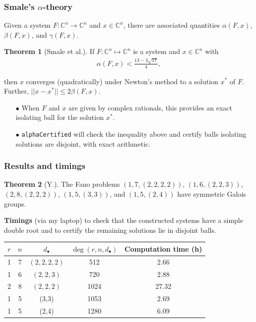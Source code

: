 \documentclass{beamer}
\theoremstyle{definition}
\newtheorem{thm}{Theorem}
\begin{document}
\begin{frame}
\frametitle{Smale's $\alpha$-theory}
Given a system $F:\mathbb{C}^n\to\mathbb{C}^n$ and $x\in\mathbb{C}^n$, there are associated quantities $\alpha(F,x)$, $\beta(F,x)$, and $\gamma(F,x)$. 

\begin{thm}[Smale et al.]
If $F:\mathbb{C}^n\mapsto\mathbb{C}^n$ is a system and $x\in\mathbb{C}^n$ with 
\vspace{-.2cm}
\begin{align*}
\alpha(F,x) < \frac{13-3\sqrt{17}}{4},
\end{align*}
\vspace{-.85cm}

then $x$ converges (quadratically) under Newton's method to a solution $x^\ast$ of $F$. Further, $||x-x^\ast||\le 2\beta(F,x)$.
\end{thm}

\begin{enumerate}
\item[$\bullet$] When $F$ and $x$ are given by complex rationals, this provides an exact isolating ball for the solution $x^\ast$. 

\item[$\bullet$] \texttt{alphaCertified} will check the inequality above and certify balls isolating solutions are disjoint, with exact arithmetic. 
\end{enumerate}

\end{frame}

\begin{frame}
\frametitle{Results and timings}
\begin{thm}[Y.] 
The Fano problems $(1,7,(2,2,2,2))$, $(1,6,(2,2,3))$, $(2,8,(2,2,2))$, $(1,5,(3,3))$, and $(1,5,(2,4))$ have symmetric Galois groups.
\end{thm}

\textbf{Timings} (via my laptop) to check that the constructed systems have a simple double root and to certify the remaining solutions lie in disjoint balls.

\begin{table}[htb]
  \label{Small Fano}
  \def\arraystretch{1.1}
  \begin{tabular}{||c|c|c|c|c||}
    \hline
    $r$ & $n$ & $d_\bullet$ & $\deg(r,n,d_\bullet)$ & Computation time (h)\\
    \hline\hline
    1 & 7 & $(2,2,2,2)$ & 512 & 2.66\\
    \hline
    1 & 6 & $(2,2,3)$ & 720  & 2.88\\
    \hline
    2 & 8 & $(2,2,2)$ & 1024 & 27.32\\
    \hline
    1 & 5 & (3,3) & 1053 & 2.69\\
    \hline
    1 & 5 & (2,4) & 1280 & 6.09\\
    \hline
  \end{tabular}
\end{table}
\end{frame}
\end{document}
